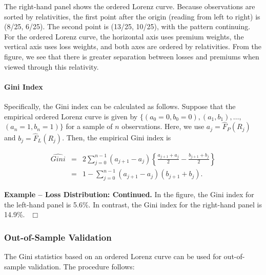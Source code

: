 \documentclass[]{book}
\let\oldparagraph\paragraph
\renewcommand{\paragraph}[1]{\oldparagraph{#1}\mbox{}}
\theoremstyle{definition}
\theoremstyle{definition}
\theoremstyle{definition}
\theoremstyle{remark}
\begin{document}
The right-hand panel shows the ordered Lorenz curve. Because
observations are sorted by relativities, the first point after the
origin (reading from left to right) is (8/25, 6/25). The second point is
(13/25, 10/25), with the pattern continuing. For the ordered Lorenz
curve, the horizontal axis uses premium weights, the vertical axis uses
loss weights, and both axes are ordered by relativities. From the
figure, we see that there is greater separation between losses and
premiums when viewed through this relativity.

\paragraph{Gini Index}\label{gini-index}

Specifically, the Gini index can be calculated as follows. Suppose that
the empirical ordered Lorenz curve is given by
\(\{ (a_0=0, b_0=0), (a_1, b_1), \ldots,\) \((a_n=1, b_n=1) \}\) for a
sample of \(n\) observations. Here, we use \(a_j = \hat{F}_P(R_j)\) and
\(b_j = \hat{F}_{L}(R_j)\). Then, the empirical Gini index is

\begin{eqnarray}
\widehat{Gini} &=&  2\sum_{j=0}^{n-1} (a_{j+1} - a_j) \left \{
\frac{a_{j+1}+a_j}{2} - \frac{b_{j+1}+b_j}{2} \right\} \nonumber \\
&=& 1 - \sum_{j=0}^{n-1} (a_{j+1} - a_j) (b_{j+1}+b_j) .\label{eq:GiniDefn}
\end{eqnarray}

\textbf{Example -- Loss Distribution: Continued.} In the figure, the
Gini index for the left-hand panel is 5.6\%. In contrast, the Gini index
for the right-hand panel is 14.9\%. \(~~\Box\)

\subsubsection{Out-of-Sample
Validation}\label{out-of-sample-validation-1}

The Gini statistics based on an ordered Lorenz curve can be used for
out-of-sample validation. The procedure follows:
\end{document}
